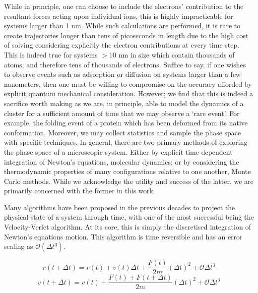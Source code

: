 While in principle, one can choose to include the electrons' contribution to the resultant forces acting upon individual ions, this is highly impracticable for systems larger than 1 nm. While such calculations are performed, it is rare to create trajectories longer than tens of picoseconds in length due to the high cost of solving considering explicitly the electron contributions at every time step. This is indeed true for systems $>$10 nm in size which contain thousands of atoms, and therefore tens of thousands of electrons. Suffice to say, if one wishes to observe events such as adsorption or diffusion on systems larger than a few nanometers, then one must be willing to compromise on the accuracy afforded by explicit quantum mechanical consideration. However; we find that this is indeed a sacrifice worth making as we are, in principle, able to model the dynamics of a cluster for a sufficient amount of time that we may observe a `rare event'. For example, the folding event of a protein which has been deformed from its native conformation. Moreover, we may collect statistics and sample the phase space with specific techniques. In general, there are two primary methods of exploring the phase space of a microscopic system. Either by explicit time dependent integration of Newton's equations, molecular dynamics; or by considering the thermodynamic properties of many configurations relative to one another, Monte Carlo methods. While we acknowledge the utility and success of the latter, we are primarily concerned with the former in this work.

Many algorithms have been proposed in the previous decades to project the physical state of a system through time, with one of the most successful being the Velocity-Verlet algorithm. At its core, this is simply the discretised integration of Newton's equations motion. This algorithm is time reversible and has an error scaling as $\mathcal{O}( \Delta t^{3} )$.

\begin{equation}
    r(t+\Delta t) = r(t) + v(t)\Delta t + \frac{F(t)} {2m}\left( \Delta t \right) ^{2} + \mathcal{O}{\Delta t^{3}}
    \label{eqn:vel-ver-r}
\end{equation}
\begin{equation}
    v(t+\Delta t) = v(t) + \frac{F(t) + F(t+\Delta t)}{2m}\left(\Delta t\right)^{2} + \mathcal{O}{\Delta t^{3}}
    \label{eqn:vel-ver-v}
\end{equation}



